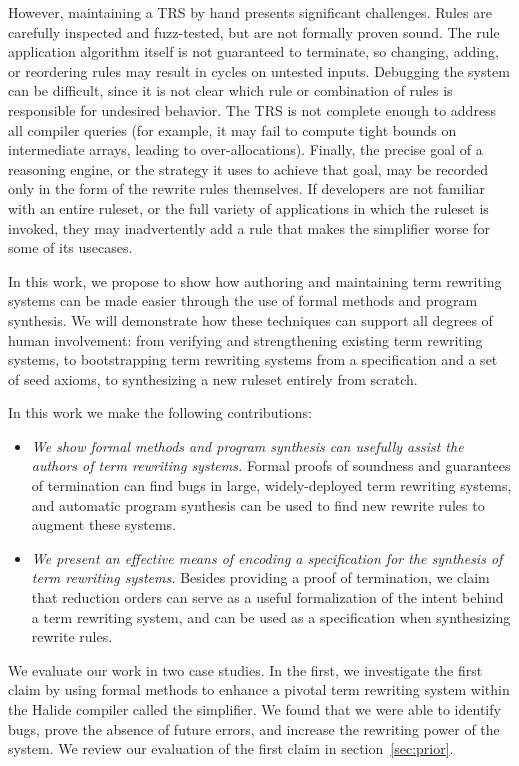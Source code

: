 However, maintaining a TRS by hand presents significant challenges. Rules are 
carefully inspected and fuzz-tested, but are not formally proven sound. The 
rule application algorithm itself is not guaranteed to terminate, so changing, adding, or 
reordering rules may result in cycles on untested inputs. Debugging the system can be 
difficult, since it is not clear which rule or combination of rules is responsible for 
undesired behavior. The TRS is not complete enough to address all compiler queries 
(for example, it may fail to compute tight bounds on intermediate arrays, leading to over-allocations).
Finally, the precise goal of a reasoning engine, or the strategy it uses to achieve that goal,
may be recorded only in the form of the rewrite rules themselves. If developers are not familiar with 
an entire ruleset, or the full variety of applications in which the ruleset is invoked, they may inadvertently 
add a rule that makes the simplifier worse for some of its usecases.

In this work, we propose to show how authoring and maintaining term rewriting systems can be made easier through the use of formal methods and program synthesis. We will demonstrate how these techniques can support all degrees of human involvement: from verifying and strengthening existing term rewriting systems, to bootstrapping term rewriting systems from a specification and a set of seed axioms, to synthesizing a new ruleset entirely from scratch.

In this work we make the following contributions:

\begin{itemize}
    \item \emph{We show formal methods and program synthesis can usefully assist the authors of term rewriting systems.} Formal proofs of soundness and guarantees of termination can find bugs in large, widely-deployed term rewriting systems, and automatic program synthesis can be used to find new rewrite rules to augment these systems.
    \item \emph{We present an effective means of encoding a specification for the synthesis of term rewriting systems.} Besides providing a proof of termination, we claim that reduction orders can serve as a useful formalization of the intent behind a term rewriting system, and can be used as a specification when synthesizing rewrite rules.
\end{itemize}

We evaluate our work in two case studies. In the first, we investigate the first claim by using formal methods to enhance a pivotal term rewriting system within the Halide compiler called the simplifier. We found that we were able to identify bugs, prove the absence of future errors, and increase the rewriting power of the system. We review our evaluation of the first claim in section~\ref{sec:prior}. 

